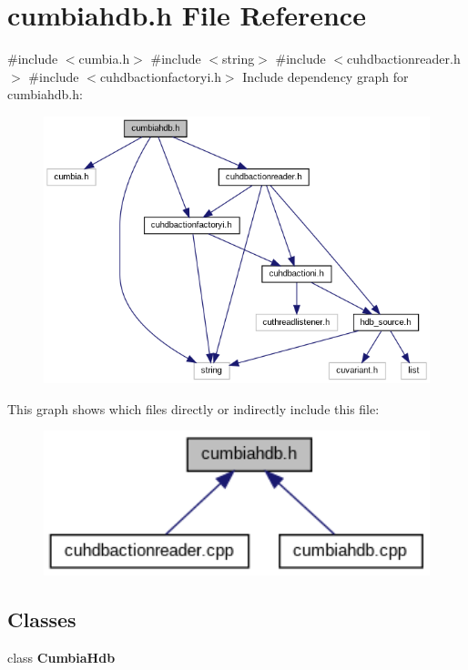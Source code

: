 \section{cumbiahdb.\+h File Reference}
\label{cumbiahdb_8h}
{\ttfamily \#include $<$cumbia.\+h$>$}\newline
{\ttfamily \#include $<$string$>$}\newline
{\ttfamily \#include $<$cuhdbactionreader.\+h$>$}\newline
{\ttfamily \#include $<$cuhdbactionfactoryi.\+h$>$}\newline
Include dependency graph for cumbiahdb.\+h\+:
\nopagebreak
\begin{figure}[H]
\begin{center}
\leavevmode
\includegraphics[width=350pt]{cumbiahdb_8h__incl}
\end{center}
\end{figure}
This graph shows which files directly or indirectly include this file\+:
\nopagebreak
\begin{figure}[H]
\begin{center}
\leavevmode
\includegraphics[width=350pt]{cumbiahdb_8h__dep__incl}
\end{center}
\end{figure}
\subsection*{Classes}
\begin{DoxyCompactItemize}
\item 
class \textbf{ Cumbia\+Hdb}
\end{DoxyCompactItemize}

